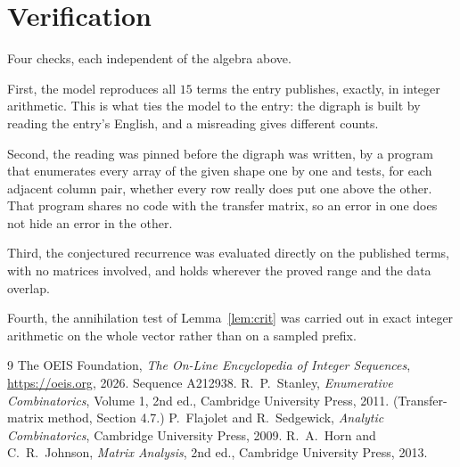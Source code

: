 \documentclass[11pt,a4paper]{article}
\theoremstyle{plain}
\theoremstyle{definition}
\begin{document}
\section{Verification}

Four checks, each independent of the algebra above.

First, the model reproduces all $15$ terms the entry publishes, exactly, in integer
arithmetic. This is what ties the model to the entry: the digraph is built by reading the
entry's English, and a misreading gives different counts.

Second, the reading was pinned before the digraph was written, by a program that enumerates
every array of the given shape one by one and tests, for each adjacent column pair,
whether every row really does put one above the other. That program shares no code with the transfer matrix, so an error in one does not
hide an error in the other.

Third, the conjectured recurrence was evaluated directly on the published terms, with no
matrices involved, and holds wherever the proved range and the data overlap.

Fourth, the annihilation test of Lemma~\ref{lem:crit} was carried out in exact integer
arithmetic on the whole vector rather than on a sampled prefix.

\begin{thebibliography}{9}
 The OEIS Foundation, \emph{The On-Line Encyclopedia of Integer
Sequences}, \url{https://oeis.org}, 2026. Sequence A212938.
 R.~P.~Stanley, \emph{Enumerative Combinatorics}, Volume 1, 2nd ed.,
Cambridge University Press, 2011. (Transfer-matrix method, Section 4.7.)
 P.~Flajolet and R.~Sedgewick, \emph{Analytic Combinatorics}, Cambridge
University Press, 2009.
 R.~A.~Horn and C.~R.~Johnson, \emph{Matrix Analysis}, 2nd ed., Cambridge
University Press, 2013.
\end{thebibliography}
\end{document}
